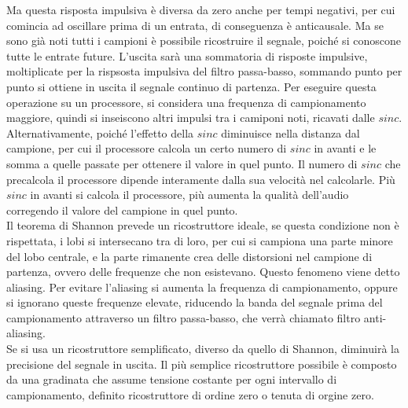 \documentclass{article}
\numberwithin{equation}{subsection}
\begin{document}
Ma questa risposta impulsiva è diversa da zero anche per tempi negativi, per cui comincia ad oscillare prima di un entrata, di conseguenza è anticausale. Ma se sono già 
noti tutti i campioni è possibile ricostruire il segnale, poiché si conoscone tutte le entrate future. L'uscita sarà una sommatoria di risposte impulsive, moltiplicate per 
la rispsosta impulsiva del filtro passa-basso, sommando punto per punto si ottiene in uscita il segnale continuo di partenza. Per eseguire questa operazione su un 
processore, si considera una frequenza di campionamento maggiore, quindi si inseiscono altri impulsi tra i camiponi noti, ricavati dalle $sinc$. Alternativamente, poiché 
l'effetto della $sinc$ diminuisce nella distanza dal campione, per cui il processore calcola un certo numero di $sinc$ in avanti e le somma a quelle passate per ottenere 
il valore in quel punto. Il numero di $sinc$ che precalcola il processore dipende interamente dalla sua velocità nel calcolarle. Più $sinc$ in avanti si calcola il 
processore, più aumenta la qualità dell'audio corregendo il valore del campione in quel punto. \\

Il teorema di Shannon prevede un ricostruttore ideale, se questa condizione non è rispettata, i lobi si intersecano tra di loro, per cui si campiona una parte minore del 
lobo centrale, e la parte rimanente crea delle distorsioni nel campione di partenza, ovvero delle frequenze che non esistevano. Questo fenomeno viene detto aliasing. Per 
evitare l'aliasing si aumenta la frequenza di campionamento, oppure si ignorano queste frequenze elevate, riducendo la banda del segnale prima del campionamento attraverso 
un filtro passa-basso, che verrà chiamato filtro anti-aliasing. \\

Se si usa un ricostruttore semplificato, diverso da quello di Shannon, diminuirà la precisione del segnale in uscita. Il più semplice ricostruttore possibile è composto 
da una gradinata che assume tensione costante per ogni intervallo di campionamento, definito ricostruttore di ordine zero o tenuta di orgine zero. 
\end{document}
